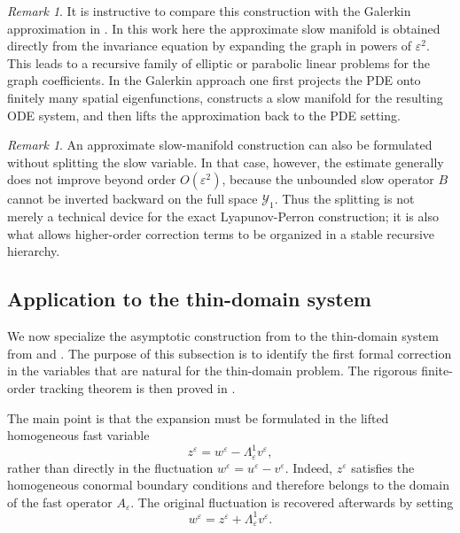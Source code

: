 \documentclass[11pt]{article}
\theoremstyle{definition}
\theoremstyle{remark}
\newtheorem{remark}[theorem]{Remark}
\numberwithin{equation}{section}
\newcommand{\mc}[1]{\mathcal{#1}}
\begin{document}
\begin{remark}
It is instructive to compare this construction with the Galerkin approximation in \cite{engel2021connecting}. 
In this work here the approximate slow manifold is obtained directly from the invariance equation by expanding the graph in powers of \(\varepsilon^2\). 
This leads to a recursive family of elliptic or parabolic linear problems for the graph coefficients. 
In the Galerkin approach one first projects the PDE onto finitely many spatial eigenfunctions, constructs a slow manifold for the resulting ODE system, and then lifts the approximation back to the PDE setting.
\end{remark}

\begin{remark}
An approximate slow-manifold construction can also be formulated without
splitting the slow variable. In that case, however, the estimate generally does
not improve beyond order \(O(\varepsilon^2)\), because the unbounded slow
operator \(B\) cannot be inverted backward on the full space \(\mc Y_1\). Thus
the splitting is not merely a technical device for the exact
Lyapunov-Perron construction; it is also what allows higher-order correction
terms to be organized in a stable recursive hierarchy.
\end{remark}

\subsection{Application to the thin-domain system}
\label{subsec:thin-domain-asymptotic-expansion}

We now specialize the asymptotic construction from  to the
thin-domain system from  and . The purpose of
this subsection is to identify the first formal correction in the variables
that are natural for the thin-domain problem. The rigorous finite-order
tracking theorem is then proved in .

The main point is that the expansion must be formulated in the lifted
homogeneous fast variable
\[
z^\varepsilon
=
w^\varepsilon-\Lambda_\varepsilon^1v^\varepsilon,
\]
rather than directly in the fluctuation \(w^\varepsilon=u^\varepsilon-v^\varepsilon\).
Indeed, \(z^\varepsilon\) satisfies the homogeneous conormal boundary
conditions and therefore belongs to the domain of the fast operator
\(A_\varepsilon\). The original fluctuation is recovered afterwards by setting
\[
w^\varepsilon
=
z^\varepsilon+\Lambda_\varepsilon^1v^\varepsilon.
\]
\end{document}
